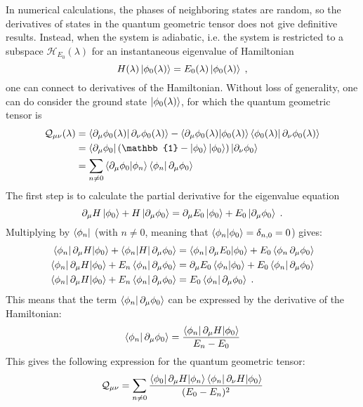 \documentclass[../main.tex]{subfiles}
\begin{document}
In numerical calculations, the phases of neighboring states are random, so the derivatives of states in the quantum geometric tensor does not give definitive results.
Instead, when the system is adiabatic, i.e. the system is restricted to a subspace \(\mathcal{H}_{E_0} (\lambda)\) for an instantaneous eigenvalue of Hamiltonian
\begin{equation}
	H (\lambda) \ket{\phi_0 (\lambda)} = E_0 (\lambda) \ket{\phi_0 (\lambda)} \;,
\end{equation}
one can connect to derivatives of the Hamiltonian.
Without loss of generality, one can do consider the ground state \(\ket{\phi_0 (\lambda)}\), for which the quantum geometric tensor is
\begin{align}
	\mathcal{Q}_{\mu \nu} (\lambda) &= \braket{\pdif{\mu} \phi_0 (\lambda) | \pdif{\nu} \phi_0 (\lambda)} - \braket{\pdif{\mu} \phi_0 (\lambda) | \phi_0 (\lambda)} \braket{\phi_0 (\lambda) | \pdif{\nu} \phi_0 (\lambda)} \\
	&= \bra{\pdif{\mu} \phi_0} (\mathbb{1} - \ket{\phi_0} \ket{\phi_0}) \ket{\pdif{\nu} \phi_0} \\
	&= \sum_{n \neq 0} \braket{\pdif{\mu} \phi_0 | \phi_n} \braket{\phi_n | \pdif{\mu} \phi_0}
\end{align}
The first step is to calculate the partial derivative for the eigenvalue equation
\begin{equation}
	\pdif{\mu} H \ket{\phi_0} + H \ket{\pdif{\mu} \phi_0} = \pdif{\mu} E_0 \ket{\phi_0} + E_0 \ket{\pdif{\mu} \phi_0} \;.
\end{equation}
Multiplying by \(\bra{\phi_n}\) (with \(n \neq 0\), meaning that \(\braket{\phi_n | \phi_0} = \delta_{n, 0} = 0\)) gives:
\begin{align}
	\braket{\phi_n | \pdif{\mu} H | \phi_0} + \braket{\phi_n | H | \pdif{\mu} \phi_0} &= \braket{\phi_n | \pdif{\mu} E_0 | \phi_0} + E_0 \braket{\phi_n \pdif{\mu} \phi_0} \\
	\braket{\phi_n | \pdif{\mu} H | \phi_0} + E_n \braket{\phi_n | \pdif{\mu} \phi_0} &= \pdif{\mu} E_0 \braket{\phi_n | \phi_0} + E_0 \braket{\phi_n | \pdif{\mu} \phi_0} \\
	\braket{\phi_n | \pdif{\mu} H | \phi_0} + E_n \braket{\phi_n | \pdif{\mu} \phi_0} &= E_0 \braket{\phi_n | \pdif{\mu} \phi_0} \;.
\end{align}
This means that the term \(\braket{\phi_n | \pdif{\mu} \phi_0}\) can be expressed by the derivative of the Hamiltonian:
\begin{align}
	\braket{\phi_n | \pdif{\mu} \phi_0} = \frac{\braket{\phi_n | \pdif{\mu} H | \phi_0}}{E_n - E_0}
\end{align}
This gives the following expression for the quantum geometric tensor:
\begin{align}
	\mathcal{Q}_{\mu \nu} = \sum_{n \neq 0} \frac{\braket{\phi_0 | \pdif{\mu} H | \phi_n} \braket{\phi_n | \pdif{\nu} H | \phi_0}}{(E_0 - E_n)^2}
\end{align}
\end{document}
